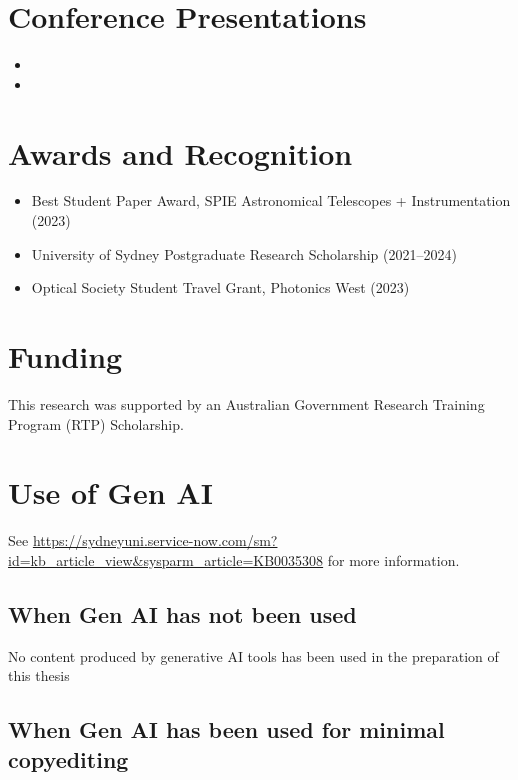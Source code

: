 \section*{Conference Presentations}
\begin{itemize}%
	\item {}
	
	\item {}
\end{itemize}

\section*{Awards and Recognition}
\begin{itemize}%
	\item Best Student Paper Award, SPIE Astronomical Telescopes + Instrumentation (2023)
	\item University of Sydney Postgraduate Research Scholarship (2021--2024)
	\item Optical Society Student Travel Grant, Photonics West (2023)
\end{itemize}

\section*{Funding}
This research was supported by an Australian Government Research Training Program (RTP) Scholarship.

\section*{Use of Gen AI}
See \url{https://sydneyuni.service-now.com/sm?id=kb_article_view&sysparm_article=KB0035308} for more information.
\subsection*{When Gen AI has not been used}
No content produced by generative AI tools has been used in the preparation of this thesis

\subsection*{When Gen AI has been used for minimal copyediting}

